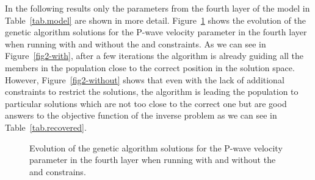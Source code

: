 \documentclass{vie16}
\begin{document}
In the following results only the parameters from the fourth
layer of the model in Table~\ref{tab.model} are shown in more
detail. Figure~\ref{fig2} shows the evolution of the genetic
algorithm solutions for the P-wave velocity parameter in the
fourth layer when running with and without the
\cite{Gardner1974} and \cite{Castagna1985} constraints. As we
can see in Figure~\ref{fig2-with}, after a few iterations the
algorithm is already guiding all the members in the population
close to the correct position in the solution space.
However, Figure~\ref{fig2-without} shows that even with the
lack of additional constraints to restrict the solutions, the
algorithm is leading the population to particular solutions
which are not too close to the correct one but are good answers
to the objective function of the inverse problem as we can see in
Table~\ref{tab.recovered}.

\begin{figure}[H]
\subfigtopskip-5pt
\caption{Evolution of the genetic algorithm solutions for the P-wave 
velocity parameter in the fourth layer when running with  
and without  the \cite{Gardner1974} and 
\cite{Castagna1985} constrains.
}
\label{fig2}
\end{figure}
\end{document}
